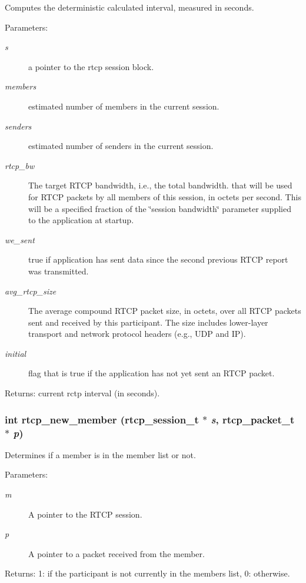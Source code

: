 Computes the deterministic calculated interval, measured in seconds. \begin{Desc}
\item[Parameters:]
\begin{description}
\item[{\em s}]a pointer to the rtcp session block. \item[{\em members}]estimated number of members in the current session. \item[{\em senders}]estimated number of senders in the current session. \item[{\em rtcp\_\-bw}]The target RTCP bandwidth, i.e., the total bandwidth. that will be used for RTCP packets by all members of this session, in octets per second. This will be a specified fraction of the \char`\"{}session bandwidth\char`\"{} parameter supplied to the application at startup. \item[{\em we\_\-sent}]true if application has sent data since the second previous RTCP report was transmitted. \item[{\em avg\_\-rtcp\_\-size}]The average compound RTCP packet size, in octets, over all RTCP packets sent and received by this participant. The size includes lower-layer transport and network protocol headers (e.g., UDP and IP). \item[{\em initial}]flag that is true if the application has not yet sent an RTCP packet. \end{description}
\end{Desc}
\begin{Desc}
\item[Returns:]current rctp interval (in seconds). \end{Desc}
\subsubsection{\setlength{\rightskip}{0pt plus 5cm}int rtcp\_\-new\_\-member ({\bf rtcp\_\-session\_\-t} $\ast$ {\em s}, {\bf rtcp\_\-packet\_\-t} $\ast$ {\em p})}\label{rtcp_8c_a4}


Determines if a member is in the member list or not. \begin{Desc}
\item[Parameters:]
\begin{description}
\item[{\em m}]A pointer to the RTCP session. \item[{\em p}]A pointer to a packet received from the member. \end{description}
\end{Desc}
\begin{Desc}
\item[Returns:]1: if the participant is not currently in the members list, 0: otherwise. \end{Desc}
